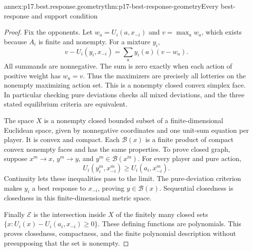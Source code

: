\begin{annexitem}{annex:p17.best.response.geometry}{thm:p17-best-response-geometry}{Every best-response and support condition}
\begin{proof}
Fix the opponents. Let \(w_a=U_i(a,x_{-i})\) and
\(v=\max_a w_a\), which exists because \(A_i\) is finite
and nonempty. For a mixture \(y_i\),
\[
              v-U_i(y_i,x_{-i})=\sum_a y_i(a)(v-w_a).
\]
All summands are nonnegative. The sum is zero exactly when
each action of positive weight has \(w_a=v\).
Thus the maximizers are precisely all lotteries on the
nonempty maximizing action set. This is a nonempty closed
convex simplex face. In particular checking pure deviations
checks all mixed deviations, and the three stated equilibrium
criteria are equivalent.

The space \(X\) is a nonempty closed bounded subset of
a finite-dimensional Euclidean space, given by nonnegative
coordinates and one unit-sum equation per player. It is
convex and compact. Each \(\mathcal B(x)\) is a finite
product of compact convex nonempty faces and has the
same properties.
To prove closed graph, suppose \(x^m\to x\),
\(y^m\to y\), and \(y^m\in\mathcal B(x^m)\).
For every player and pure action,
\[
                  U_i(y_i^m,x_{-i}^m)\geq U_i(a_i,x_{-i}^m).
\]
Continuity lets these inequalities pass to the limit.
The pure-deviation criterion makes \(y_i\) a best response
to \(x_{-i}\), proving \(y\in\mathcal B(x)\).
Sequential closedness is closedness in this finite-dimensional
metric space.

Finally \(\mathcal E\) is the intersection inside \(X\)
of the finitely many closed sets
\(\{x:U_i(x)-U_i(a_i,x_{-i})\geq0\}\).
These defining functions are polynomials. This proves
closedness, compactness, and the finite polynomial
description without presupposing that the set is nonempty.
\end{proof}
\end{annexitem}

